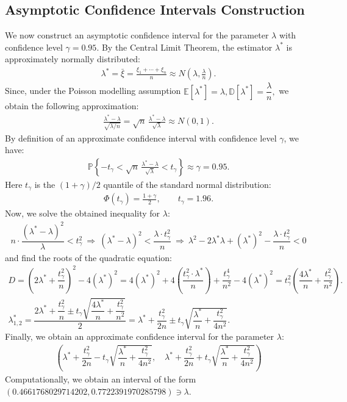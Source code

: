 \documentclass[final,3p,times,onecolumn]{elsarticle}
\begin{document}
\subsection{Asymptotic Confidence Intervals Construction}
We now construct an asymptotic confidence interval for the parameter $\lambda$ with confidence level $\gamma = 0.95$.
By the Central Limit Theorem, the estimator $\lambda^*$ is approximately normally distributed:
\begin{gather*}
\lambda^* = \bar{\xi} = \frac{\xi_1 + \cdots + \xi_n}{n} \approx N\!\left(\lambda, \frac{\lambda}{n}\right).
\end{gather*}
Since, under the Poisson modelling assumption $\mathbb{E}[\lambda^*] = \lambda, \mathbb{D}[\lambda^*] = \dfrac{\lambda}{n},$
we obtain the following approximation:
\begin{gather*}
\frac{\lambda^* - \lambda}{\sqrt{\lambda / n}}
= \sqrt{n}\,\frac{\lambda^* - \lambda}{\sqrt{\lambda}}
\approx N(0,1).
\end{gather*}
By definition of an approximate confidence interval with confidence level $\gamma$, we have:
\begin{gather*}
\mathbb{P}\left\{
- t_{\gamma} 
< \sqrt{n}\,\frac{\lambda^* - \lambda}{\sqrt{\lambda}}
< t_{\gamma}
\right\}
\approx \gamma = 0.95.
\end{gather*}
Here $t_{\gamma}$ is the $(1+\gamma)/2$ quantile of the standard normal distribution:
\begin{gather*}
\Phi(t_{\gamma}) = \frac{1+\gamma}{2},
\qquad t_{\gamma} = 1.96.
\end{gather*}
Now, we solve the obtained inequality for $\lambda$:
\begin{gather*}
n \cdot \dfrac{(\lambda^* - \lambda)^2}{\lambda} < t_{\gamma}^2 \ \Longrightarrow \ 
(\lambda^* - \lambda)^2 < \dfrac{\lambda \cdot t_{\gamma}^2}{n} \ \Longrightarrow \ 
\lambda^2 - 2\lambda^*\lambda + (\lambda^*)^2 - \dfrac{\lambda \cdot t_{\gamma}^2}{n} < 0
\end{gather*}
and find the roots of the quadratic equation: 
\begin{gather*}
D = \left(2\lambda^* + \dfrac{t_{\gamma}^2}{n}\right)^2 - 4(\lambda^*)^2 = 4(\lambda^*)^2 + 4\left(\dfrac{t_{\gamma}^2 \cdot \lambda^*}{n}\right) + \dfrac{t_{\gamma}^4}{n^2} - 4(\lambda^*)^2 = t_{\gamma}^2 \left(\dfrac{4\lambda^*}{n} + \dfrac{t_{\gamma}^2}{n^2}\right).
\\
\lambda_{1, 2}^* = \dfrac{2\lambda^* + \dfrac{t_{\gamma}^2}{n} \pm t_{\gamma}\sqrt{\dfrac{4\lambda^*}{n} + \dfrac{t_{\gamma}^2}{n^2}}}{2} = \lambda^* + \dfrac{t_{\gamma}^2}{2n} \pm t_{\gamma} \sqrt{\dfrac{\lambda^*}{n} + \dfrac{t_{\gamma}^2}{4n^2}}.
\end{gather*}
Finally, we obtain an approximate confidence interval for the parameter $\lambda$: 
\begin{gather*}
\left(
    \lambda^* + \dfrac{t_{\gamma}^2}{2n} - t_{\gamma} \sqrt{\dfrac{\lambda^*}{n} + \dfrac{t_{\gamma}^2}{4n^2}}, \quad
    \lambda^* + \dfrac{t_{\gamma}^2}{2n} + t_{\gamma} \sqrt{\dfrac{\lambda^*}{n} + \dfrac{t_{\gamma}^2}{4n^2}}
\right) 
\end{gather*}
Computationally, we obtain an interval of the form $(0.4661768029714202, 0.7722391970285798) \ni \lambda$.
\end{document}
